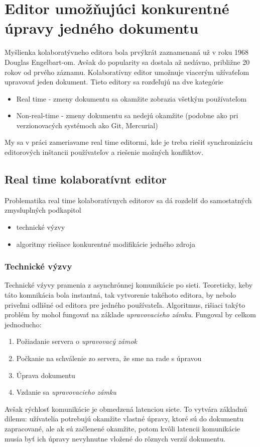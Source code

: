 \chapter{Editor umožňujúci konkurentné úpravy jedného dokumentu}

\label{kap:zdialtelnost} %

Myšlienka kolaboratývneho editora bola prvýkrát zaznamenaná už v roku 1968 Douglas Engelbart-om. 
Avšak do popularity sa dostala až nedávno, približne 20 rokov od prvého záznamu.
Kolaboratívny editor umožnuje viacerým užívaťeľom upravovať jeden dokument.
Tieto editory sa rozďeľujú na dve kategórie
\begin{itemize}
  \item Real time - zmeny dokumentu sa okamžite zobrazia všetkým používateľom
  \item Non-real-time - zmeny dokumentu sa nedejú okamžite (podobne ako pri verzionovacých
  systémoch ako Git, Mercurial)
\end{itemize}
My sa v práci zameriavame real time editormi, kde je treba riešiť synchronizáciu editorových
inštancii používateľov a riešenie možných konfliktov.

\section{Real time kolaboratívnt editor}
Problematika real time kolaboratívnych editorov sa dá rozdeliť do samostatných zmysluplných 
podkapitol
\begin{itemize}
\item  technické výzvy
\item  algoritmy riešiace konkurentné modifikácie jedného zdroja
\end{itemize}

\subsection{Technické výzvy}
Technické vźyvy pramenia z asynchrónnej komunikácie po sieti. Teoreticky, keby táto 
komnikácia bola instantná, tak vytvorenie takéhoto editora, by nebolo priveľmi odlišné od
editora pre jedného používateľa. Algoritmus, rišiaci takýto problém by mohol fungovať na 
základe \textit{upravovacieho zámku}. Fungoval by celkom jednoducho:
\begin{enumerate}
  \item Požiadanie servera o \textit{upravovacý zámok}
  \item Počkanie na schválenie zo servera, že sme na rade s úpravou
  \item Úprava dokumentu
  \item Vzdanie sa \textit{upravovacieho zámku}
\end{enumerate}
Avšak rýchlosť komunikácie je obmedzená latenciou siete. To vytvára základnú dilemu: 
užívatelia potrebujú okamžite vlastné úpravy, ktoré sú do dokumentu zapracované,
ale ak sú začlenené okamžite, potom kvôli latencii komunikácie musia byť ich
úpravy nevyhnutne vložené do rôznych verzií dokumentu.

